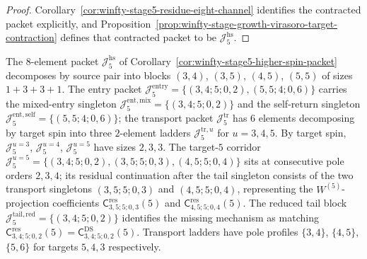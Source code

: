 \begin{proof}
Corollary~\ref{cor:winfty-stage5-residue-eight-channel} identifies the
contracted packet explicitly, and
Proposition~\ref{prop:winfty-stage-growth-virasoro-target-contraction}
defines that contracted packet to be
$\mathcal{J}_5^{\mathrm{hs}}$.
\end{proof}

\begin{remark}
\label{rem:winfty-stage5-higher-spin-subblocks}%
\label{rem:winfty-stage5-entry-transport}%
\label{rem:winfty-stage5-entry-singletons}%
\label{rem:winfty-stage5-entry-mixed-self}%
\label{rem:winfty-stage5-reduced-tail-singleton}%
\label{rem:winfty-stage5-tail-mechanism}%
\label{rem:winfty-stage5-transport-target-ladders}%
\label{rem:winfty-stage5-higher-spin-target-blocks}%
\label{rem:winfty-stage5-target5-corridor}%
\label{rem:winfty-stage5-target5-residual}%
\label{rem:winfty-stage5-target5-transport-mechanism}%
\label{rem:winfty-stage5-target5-transport-singletons}%
\label{rem:winfty-stage5-transport-pole-profiles}%
\label{rem:winfty-stage5-first-subproblems}%
The $8$-element packet $\mathcal{J}_5^{\mathrm{hs}}$ of
Corollary~\ref{cor:winfty-stage5-higher-spin-packet} decomposes by
source pair into blocks $(3,4)$, $(3,5)$, $(4,5)$, $(5,5)$ of sizes
$1+3+3+1$. The entry packet
$\mathcal{J}_5^{\mathrm{entry}}=\{(3,4;5;0,2),(5,5;4;0,6)\}$ carries
the mixed-entry singleton $\mathcal{J}_5^{\mathrm{ent,mix}}=\{(3,4;5;0,2)\}$ and the self-return
singleton $\mathcal{J}_5^{\mathrm{ent,self}}=\{(5,5;4;0,6)\}$; the transport packet
$\mathcal{J}_5^{\mathrm{tr}}$ has $6$ elements decomposing by target
spin into three $2$-element ladders $\mathcal{J}_5^{\mathrm{tr},u}$ for
$u=3,4,5$. By target spin,
$\mathcal{J}_5^{u=3}$, $\mathcal{J}_5^{u=4}$, $\mathcal{J}_5^{u=5}$
have sizes $2,3,3$. The target-$5$ corridor
$\mathcal{J}_5^{u=5}=\{(3,4;5;0,2),(3,5;5;0,3),(4,5;5;0,4)\}$ sits at
consecutive pole orders $2,3,4$; its residual continuation after the
tail singleton consists of the two transport singletons
$(3,5;5;0,3)$ and $(4,5;5;0,4)$, representing the
$W^{(5)}$-projection coefficients
$\mathsf{C}^{\mathrm{res}}_{3,5;5;0,3}(5)$ and
$\mathsf{C}^{\mathrm{res}}_{4,5;5;0,4}(5)$. The reduced tail block
$\mathcal{J}_5^{\mathrm{tail,red}}=\{(3,4;5;0,2)\}$ identifies the
missing mechanism as matching
$\mathsf{C}^{\mathrm{res}}_{3,4;5;0,2}(5)=\mathsf{C}^{\mathrm{DS}}_{3,4;5;0,2}(5)$.
Transport ladders have pole profiles $\{3,4\}$, $\{4,5\}$, $\{5,6\}$
for targets $5,4,3$ respectively.
\end{remark}

